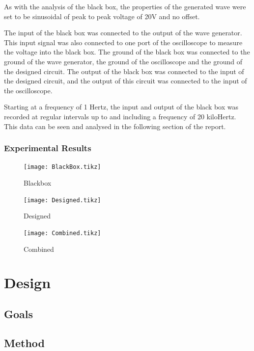 \documentclass[12pt]{article} %
\begin{document}
As with the analysis of the black box, the properties of the generated wave were set to be sinusoidal of peak to peak voltage of 20V and no offset.

The input of the black box was connected to the output of the wave generator. This input signal was also connected to one port of the oscilloscope to measure the voltage into the black box. The ground of the black box was connected to the ground of the wave generator, the ground of the oscilloscope and the ground of the designed circuit. The output of the black box was connected to the input of the designed circuit, and the output of this circuit was connected to the input of the oscilloscope.

Starting at a frequency of 1 Hertz, the input and output of the black box was recorded at regular intervals up to and including a frequency of 20 kiloHertz. This data can be seen and analysed in the following section of the report.

\subsubsection{Experimental Results}

\begin{figure}
 	\centering
	\texttt{[image: BlackBox.tikz]}
	\caption{Blackbox}
\end{figure}

\begin{figure}
 	\centering
	\texttt{[image: Designed.tikz]}
	\caption{Designed}
\end{figure}

\begin{figure}
 	\centering
	\texttt{[image: Combined.tikz]}
	\caption{Combined}
\end{figure}

\pagebreak





\section{Design}

\subsection{Goals}


\subsection{Method}
\end{document}

